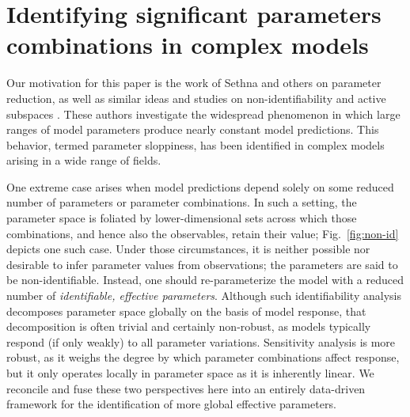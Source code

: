 \chapter{Identifying significant parameters combinations in complex
  models\label{ch:params}}




Our motivation for this paper is the work of Sethna and others on
parameter reduction\cite{AS06}, as well as similar ideas and studies
on non-identifiability \cite{RKMBSKT09} and active subspaces
\cite{CDW14}. These authors investigate the widespread phenomenon in
which large ranges of model parameters produce nearly constant model
predictions. This behavior, termed parameter sloppiness, has been
identified in complex models arising in a wide range of fields.

One extreme case arises when model predictions depend solely on some
reduced number of parameters or parameter combinations.  In such a
setting, the parameter space is foliated by lower-dimensional sets
across which those combinations, and hence also the observables,
retain their value; Fig.~\ref{fig:non-id} depicts one such case.
Under those circumstances, it is neither possible nor desirable to
infer parameter values from observations; the parameters are said to
be non-identifiable. Instead, one should re-parameterize the model
with a reduced number of \emph{identifiable, effective parameters}.
Although such identifiability analysis decomposes parameter space
globally on the basis of model response, that decomposition is often
trivial and certainly non-robust, as models typically respond (if only
weakly) to all parameter variations.  Sensitivity analysis is more
robust, as it weighs the degree by which parameter combinations affect
response, but it only operates locally in parameter space as it is
inherently linear. We reconcile and fuse these two perspectives here
into an entirely data-driven framework for the identification of more
global effective parameters.

